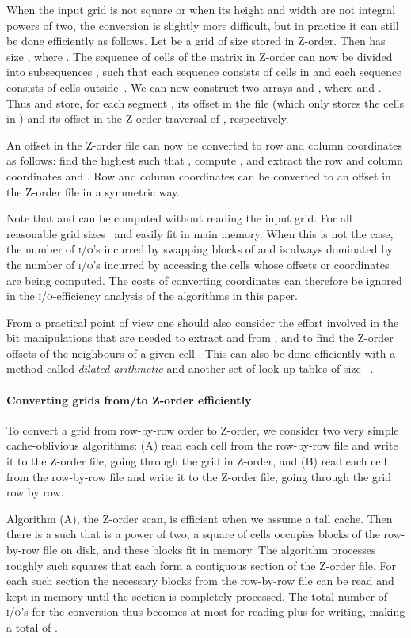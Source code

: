\documentclass[10pt,a4paper]{article}
\def\io{\textsc{i/o}\xspace}
\def\ios{\textsc{i/o}'s\xspace}
\begin{document}
When the input grid is not square or when its height and width are not integral powers of two, the conversion is slightly more difficult, but in practice it can still be done efficiently as follows. Let  be a grid of size  stored in Z-order. Then  has size , where . The sequence of cells of the matrix  in Z-order can now be divided into  subsequences , such that each sequence  consists of cells in  and each sequence  consists of cells outside~. We can now construct two arrays  and , where  and . Thus  and  store, for each segment , its offset in the file (which only stores the cells in ) and its offset in the Z-order traversal of , respectively.

An offset  in the Z-order file can now be converted to row and column coordinates as follows: find the highest  such that , compute , and extract the row and column coordinates  and . Row and column coordinates can be converted to an offset in the Z-order file in a symmetric way.

Note that  and  can be computed without reading the input grid. For all reasonable grid sizes ~and  easily fit in main memory. When this is not the case, the number of \ios incurred by swapping blocks of  and  is always dominated by the number of \ios incurred by accessing the cells whose offsets or coordinates are being computed. The costs of converting coordinates can therefore be ignored in the \io-efficiency analysis of the algorithms in this paper.

From a practical point of view one should also consider the effort involved in the bit manipulations that are needed to extract  and  from , and to find the Z-order offsets of the neighbours of a given cell . This can also be done efficiently with a method called \emph{dilated arithmetic} and another set of look-up tables of size ~\cite{bitmanipulation}.

\paragraph{Converting grids from/to Z-order efficiently}
To convert a grid from row-by-row order to Z-order, we consider two very simple cache-oblivious algorithms: (A) read each cell from the row-by-row file and write it to the Z-order file, going through the grid in Z-order, and (B) read each cell from the row-by-row file and write it to the Z-order file, going through the grid row by row.

Algorithm (A), the Z-order scan, is efficient when we assume a tall cache. Then there is a  such that  is a power of two, a square of  cells occupies  blocks of the row-by-row file on disk, and these blocks fit in memory.
The algorithm processes roughly  such squares that each form a contiguous section of the Z-order file. For each such section the necessary blocks from the row-by-row file can be read and kept in memory until the section is completely processed. The total number of \ios for the conversion thus becomes at most  for reading plus  for writing, making a total of .
\end{document}
